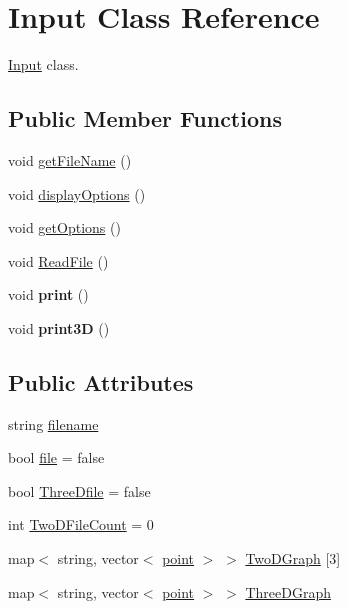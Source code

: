 \hypertarget{classInput}{}\section{Input Class Reference}
\label{classInput}


\hyperlink{classInput}{Input} class.  


\subsection*{Public Member Functions}
\begin{DoxyCompactItemize}
\item 
void \hyperlink{classInput_abb4311267ded94768e6df9cb88b179bb}{get\+File\+Name} ()
\item 
void \hyperlink{classInput_a29639b68a8a421e0cb1b576eae3f8259}{display\+Options} ()
\item 
void \hyperlink{classInput_af0a5bad322752da31bcd7b1e2d99d611}{get\+Options} ()
\item 
void \hyperlink{classInput_a9d9395f68b01faa00f962791878723a2}{Read\+File} ()
\item 
void {\bfseries print} ()\hypertarget{classInput_a862e529a6ed3fcfd0719274a04174b7d}{}\label{classInput_a862e529a6ed3fcfd0719274a04174b7d}

\item 
void {\bfseries print3D} ()\hypertarget{classInput_aced126e54ffa271b2a40f7e7a5e90376}{}\label{classInput_aced126e54ffa271b2a40f7e7a5e90376}

\end{DoxyCompactItemize}
\subsection*{Public Attributes}
\begin{DoxyCompactItemize}
\item 
string \hyperlink{classInput_af296359065236ac9139aab7736d6844d}{filename}
\item 
bool \hyperlink{classInput_ad073fa115ead2e8b7492214215ebd22d}{file} = false
\item 
bool \hyperlink{classInput_aacb0e034125e32179081a97eecab47df}{Three\+Dfile} = false
\item 
int \hyperlink{classInput_a82141fe9142aec447f9ef52fd2f78c73}{Two\+D\+File\+Count} = 0
\item 
map$<$ string, vector$<$ \hyperlink{structpoint}{point} $>$ $>$ \hyperlink{classInput_a55526617adbcb0db4b3d565f4dbe772d}{Two\+D\+Graph} \mbox{[}3\mbox{]}
\item 
map$<$ string, vector$<$ \hyperlink{structpoint}{point} $>$ $>$ \hyperlink{classInput_aed882deebbb45d8423e5477e8ccaee60}{Three\+D\+Graph}
\end{DoxyCompactItemize}



